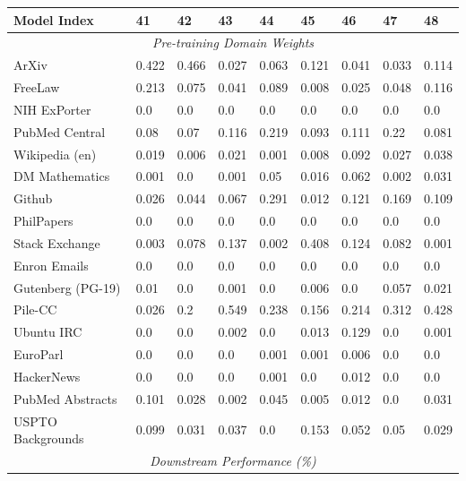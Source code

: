 \begin{table}[!ht]
    \centering
    \begin{tabular}{lllllllll}
    \toprule
        \textbf{Model Index} & \textbf{41} & \textbf{42} & \textbf{43} & \textbf{44} & \textbf{45} & \textbf{46} & \textbf{47} & \textbf{48} \\ \midrule
        \multicolumn{9}{c}{\textit{Pre-training Domain Weights}} \\
        ArXiv & 0.422 & 0.466 & 0.027 & 0.063 & 0.121 & 0.041 & 0.033 & 0.114 \\ 
        FreeLaw & 0.213 & 0.075 & 0.041 & 0.089 & 0.008 & 0.025 & 0.048 & 0.116 \\ 
        NIH ExPorter & 0.0 & 0.0 & 0.0 & 0.0 & 0.0 & 0.0 & 0.0 & 0.0 \\ 
        PubMed Central & 0.08 & 0.07 & 0.116 & 0.219 & 0.093 & 0.111 & 0.22 & 0.081 \\ 
        Wikipedia (en) & 0.019 & 0.006 & 0.021 & 0.001 & 0.008 & 0.092 & 0.027 & 0.038 \\ 
        DM Mathematics & 0.001 & 0.0 & 0.001 & 0.05 & 0.016 & 0.062 & 0.002 & 0.031 \\ 
        Github & 0.026 & 0.044 & 0.067 & 0.291 & 0.012 & 0.121 & 0.169 & 0.109 \\ 
        PhilPapers & 0.0 & 0.0 & 0.0 & 0.0 & 0.0 & 0.0 & 0.0 & 0.0 \\ 
        Stack Exchange & 0.003 & 0.078 & 0.137 & 0.002 & 0.408 & 0.124 & 0.082 & 0.001 \\ 
        Enron Emails & 0.0 & 0.0 & 0.0 & 0.0 & 0.0 & 0.0 & 0.0 & 0.0 \\ 
        Gutenberg (PG-19) & 0.01 & 0.0 & 0.001 & 0.0 & 0.006 & 0.0 & 0.057 & 0.021 \\ 
        Pile-CC & 0.026 & 0.2 & 0.549 & 0.238 & 0.156 & 0.214 & 0.312 & 0.428 \\ 
        Ubuntu IRC & 0.0 & 0.0 & 0.002 & 0.0 & 0.013 & 0.129 & 0.0 & 0.001 \\ 
        EuroParl & 0.0 & 0.0 & 0.0 & 0.001 & 0.001 & 0.006 & 0.0 & 0.0 \\ 
        HackerNews & 0.0 & 0.0 & 0.0 & 0.001 & 0.0 & 0.012 & 0.0 & 0.0 \\ 
        PubMed Abstracts & 0.101 & 0.028 & 0.002 & 0.045 & 0.005 & 0.012 & 0.0 & 0.031 \\ 
        USPTO Backgrounds & 0.099 & 0.031 & 0.037 & 0.0 & 0.153 & 0.052 & 0.05 & 0.029 \\ 
        \midrule
        \multicolumn{9}{c}{\textit{Downstream Performance (\%)}} \\

\end{tabular}
\end{table}
